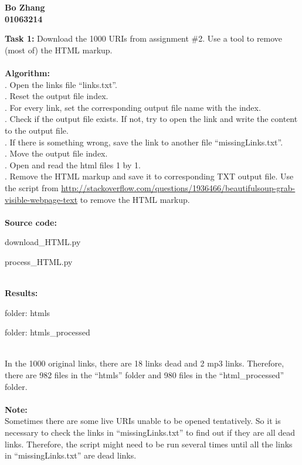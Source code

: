 \documentclass{article}
\begin{document}
		\begin{center}\textbf{Bo Zhang\\01063214\\}
		\end{center}
		\noindent
		\textbf{Task 1: }Download the 1000 URIs from assignment \#2. Use a tool to remove (most of) the HTML markup.\\\\
		\textbf{Algorithm: }\\
		. Open the links file ``links.txt''.\\
		. Reset the output file index.\\
		. For every link, set the corresponding output file name with the index.\\
		. Check if the output file exists. If not, try to open the link and write the content to the output file.\\
		. If there is something wrong, save the link to another file ``missingLinks.txt''.	\\
		. Move the output file index.\\
		. Open and read the html files 1 by 1.\\
		. Remove the HTML markup and save it to corresponding TXT output file. Use the script from \url{http://stackoverflow.com/questions/1936466/beautifulsoup-grab-visible-webpage-text} to remove the HTML markup.\\\\
		\textbf{Source code:}
		\begin{list}{}
			\item download\_HTML.py
			\item process\_HTML.py
		\end{list}
		\noindent
		\\\textbf{Results:}
		\begin{list}{}
			\item folder: htmls
			\item folder: htmls\_processed
		\end{list}
		\indent\\
		\indent In the 1000 original links, there are 18 links dead and 2 mp3 links. Therefore, there are 982 files in the ``htmls'' folder and 980 files in the ``html\_processed'' folder.\\
		\noindent
		\\\textbf{Note:}\\
		\indent Sometimes there are some live URIs unable to be opened tentatively. So it is necessary to check the links in ``missingLinks.txt'' to find out if they are all dead links. Therefore, the script might need to be run several times until all the links in ``missingLinks.txt'' are dead links.\\
\end{document}
